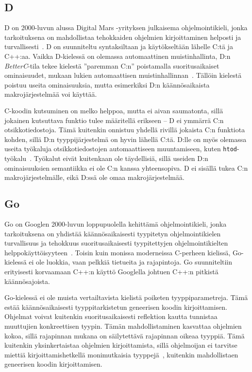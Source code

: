 \subsection{D}

D on 2000-luvun alussa Digital Mars -yrityksen julkaisema ohjelmointikieli,
jonka tarkoituksena on mahdollistaa tehokkaiden ohjelmien kirjoittaminen
helposti ja turvallisesti~\citep{dhistory}. D on suunniteltu syntaksiltaan ja
käytökseltään lähelle C:tä ja C++:aa. Vaikka D-kielessä on olemassa
automaattinen muistinhallinta, D:n \emph{BetterC}-tila tekee kielestä
''paremman C:n'' poistamalla suoritusaikaiset ominaisuudet, mukaan lukien
automaattisen muistinhallinnan~\citep{dbetterc}. Tällöin kielestä poistuu
useita ominaisuuksia, mutta esimerkiksi D:n käännösaikaista makrojärjestelmää
voi käyttää.

C-koodin kutsuminen on melko helppoa, mutta ei aivan saumatonta, sillä jokainen
kutsuttava funktio tulee määritellä erikseen -- D ei ymmärrä C:n
otsikkotiedostoja. Tämä kuitenkin onnistuu yhdellä rivillä jokaista C:n
funktiota kohden, sillä D:n tyyppijärjestelmä on hyvin lähellä C:tä. D:lle on
myös olemassa useita työkaluja otsikkotiedostojen automaattiseen muuntamiseen,
kuten \texttt{htod}-työkalu~\citep{htod}. Työkalut eivät kuitenkaan ole
täydellisiä, sillä useiden D:n ominaisuuksien semantiikka ei ole C:n kanssa
yhteensopiva. D ei sisällä tukea C:n makrojärjestelmälle, eikä D:ssä ole
omaa makrojärjestelmää.

\subsection{Go}

Go on Googlen 2000-luvun loppupuolella kehittämä ohjelmointikieli, jonka
tarkoituksena on yhdistää käännösaikaisesti tyypitetyn ohjelmointikielen
turvallisuus ja tehokkuus suoritusaikaisesti tyypitettyjen ohjelmointikielten
helppokäyttöisyyteen~\citep{gohistory}. Toisin kuin monissa moderneissa
C-perheen kielissä, Go-kielessä ei ole luokkia, vaan pelkkiä tietueita ja
rajapintoja. Go suunniteltiin erityisesti korvaamaan C++:n käyttö Googlella
johtuen C++:n pitkistä käännösajoista.

Go-kielessä ei ole muista vertailtavista kielistä poiketen tyyppiparametreja.
Tämä estää käännösaikaisesti tyyppitarkistetun geneerisen koodin
kirjoittamisen. Ohjelmat voivat kuitenkin suoritusaikaisesti reflektion kautta
tunnistaa muuttujien konkreettisen tyypin. Tämän mahdollistaminen kasvattaa
ohjelmien kokoa, sillä rajapinnan mukana on säilytettävä rajapinnan oikeaa
tyyppiä. Tämä kuitenkin yksinkertaistaa ohjelmien kirjoittamista, sillä
ohjelmoijan ei tarvitse miettiä kirjoittamishetkellä monimutkaisia
tyyppejä~\citep[esim.][kalvo 8]{gohistory}, kuitenkin mahdollistaen geneerisen
koodin kirjoittamisen.


